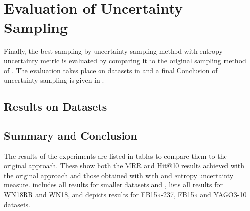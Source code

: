 \section{Evaluation of Uncertainty Sampling}
\label{ch:evaluation:sec:evaluation_uncertainty}
%
Finally, the best sampling by uncertainty sampling method \ussoftmax with entropy uncertainty metric is evaluated by comparing it to the original sampling method \origsampling of \kbgan.
The evaluation takes place on datasets in  and a final Conclusion of uncertainty sampling is given in .
%
\subsection{Results on Datasets} \label{subsec:results_uncertainty}















\subsection{Summary and Conclusion}
\label{subsec:uncertainty_conclusion}
%
The results of the experiments are listed in tables to compare them to the original approach.
These show both the MRR and Hit@10 results achieved with the original approach \kbgan and those obtained with \usgan with \ussoftmax and entropy uncertainty measure.
 includes all results for smaller datasets \umls and \kinship,
 lists all results for \textsc{WN18RR} and \textsc{WN18}, and  depicts results for \textsc{FB15k-237}, \textsc{FB15k} and \textsc{YAGO3-10} datasets.

